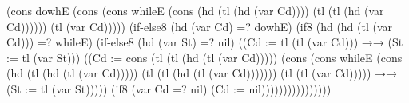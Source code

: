                                (cons dowhE
                                     (cons (cons whileE
                                                 (cons (hd (tl (hd (var Cd))))
                                                       (tl (tl (hd (var Cd))))))
                                           (tl (var Cd)))))
         (if-else8 (hd (var Cd) =? dowhE)
                   (if8 (hd (hd (tl (var Cd))) =? whileE)
                        (if-else8 (hd (var St) =? nil)
                                  ((Cd := tl (tl (var Cd)))
                                  →→ (St := tl (var St)))
                        ((Cd := cons (tl (tl (hd (tl (var Cd)))))
                                     (cons (cons whileE
                                                 (cons (hd (tl (hd (tl (var Cd)))))
                                                       (tl (tl (hd (tl (var Cd)))))))
                                           (tl (tl (var Cd)))))
                        →→ (St := tl (var St)))))
         (if8      (var Cd =? nil)                (Cd := nil))))))))))))))))
\fi